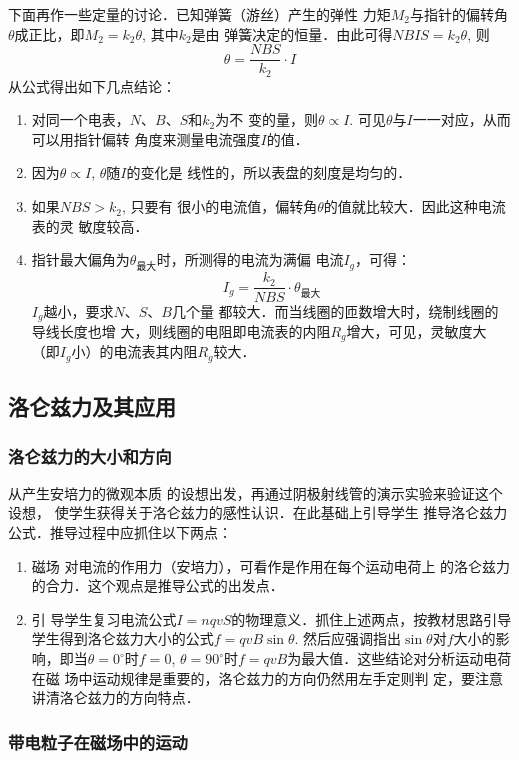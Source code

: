 下面再作一些定量的讨论．已知弹簧（游丝）产生的弹性
力矩$M_2$与指针的偏转角$\theta$成正比，即$M_2=k_2\theta$, 其中$k_2$是由
弹簧决定的恒量．由此可得$NBIS=k_2\theta$, 则
\[\theta=\frac{NBS}{k_2}\cdot I\]
从公式得出如下几点结论：
\begin{enumerate}
\item 对同一个电表，$N$、$B$、$S$和$k_2$为不
变的量，则$\theta\propto I$. 可见$\theta$与$I$一一对应，从而可以用指针偏转
角度来测量电流强度$I$的值．
    \item 因为$\theta\propto I$, $\theta$随$I$的变化是
线性的，所以表盘的刻度是均匀的．    
\item 如果$NBS>k_2$, 只要有
很小的电流值，偏转角$\theta$的值就比较大．因此这种电流表的灵
敏度较高． 
   \item 指针最大偏角为$\theta_{\text{最大}}$时，所测得的电流为满偏
电流$I_g$，可得：
\[I_g=\frac{k_2}{NBS}\cdot \theta_{\text{最大}}\]
$I_g$越小，要求$N$、$S$、$B$几个量
都较大．而当线圈的匝数增大时，绕制线圈的导线长度也增
大，则线圈的电阻即电流表的内阻$R_g$增大，可见，灵敏度大
（即$I_g$小）的电流表其内阻$R_g$较大．
\end{enumerate}

\subsection{洛仑兹力及其应用}
\subsubsection{洛仑兹力的大小和方向}

从产生安培力的微观本质
的设想出发，再通过阴极射线管的演示实验来验证这个设想，
使学生获得关于洛仑兹力的感性认识．在此基础上引导学生
推导洛仑兹力公式．推导过程中应抓住以下两点：
\begin{enumerate}
\item 磁场
对电流的作用力（安培力），可看作是作用在每个运动电荷上
的洛仑兹力的合力．这个观点是推导公式的出发点．
\item 引
导学生复习电流公式$I=nqvS$的物理意义．抓住上述两点，按教材思路引导学生得到洛仑兹力大小的公式$f=qvB\sin \theta$.
然后应强调指出$\sin\theta$对$f$大小的影响，即当$\theta=0^{\circ}$时$f=0$, 
$\theta=90^{\circ}$时$f=qvB$为最大值．这些结论对分析运动电荷在磁
场中运动规律是重要的，洛仑兹力的方向仍然用左手定则判
定，要注意讲清洛仑兹力的方向特点．
\end{enumerate}

\subsubsection{带电粒子在磁场中的运动}

